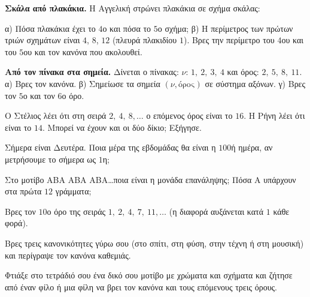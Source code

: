 \ex \textbf{Σκάλα από πλακάκια.} Η Αγγελική στρώνει πλακάκια σε σχήμα σκάλας:\par
\begin{center}\qquad{}\qquad{}\qquad{}\end{center}
α) Πόσα πλακάκια έχει το $4$ο και πόσα το $5$ο σχήμα; β) Η περίμετρος των πρώτων τριών σχημάτων είναι $4$, $8$, $12$ (πλευρά πλακιδίου $1$). Βρες την περίμετρο του $4$ου και του $5$ου και τον κανόνα που ακολουθεί.

\ex \textbf{Από τον πίνακα στα σημεία.} Δίνεται ο πίνακας: $\nu$: $1,\ 2,\ 3,\ 4$ και όρος: $2,\ 5,\ 8,\ 11$. α) Βρες τον κανόνα. β) Σημείωσε τα σημεία $(\nu,\text{όρος})$ σε σύστημα αξόνων. γ) Βρες τον $5$ο και τον $6$ο όρο.


\ex Ο Στέλιος λέει ότι στη σειρά $2,\ 4,\ 8,\dots$ ο επόμενος όρος είναι το $16$. Η Ρήνη λέει ότι είναι το $14$. Μπορεί να έχουν και οι δύο δίκιο; Εξήγησε.

\ex Σήμερα είναι Δευτέρα. Ποια μέρα της εβδομάδας θα είναι η $100$ή ημέρα, αν μετρήσουμε το σήμερα ως $1$η;

\ex Στο μοτίβο ΑΒΑ ΑΒΑ ΑΒΑ\ldots ποια είναι η μονάδα επανάληψης; Πόσα Α υπάρχουν στα πρώτα $12$ γράμματα;

\ex Βρες τον $10$ο όρο της σειράς $1,\ 2,\ 4,\ 7,\ 11,\dots$ (η διαφορά αυξάνεται κατά $1$ κάθε φορά).


\ex Βρες τρεις κανονικότητες γύρω σου (στο σπίτι, στη φύση, στην τέχνη ή στη μουσική) και περίγραψε τον κανόνα καθεμιάς.

\ex Φτιάξε στο τετράδιό σου ένα δικό σου μοτίβο με χρώματα και σχήματα και ζήτησε από έναν φίλο ή μια φίλη να βρει τον κανόνα και τους επόμενους τρεις όρους.
